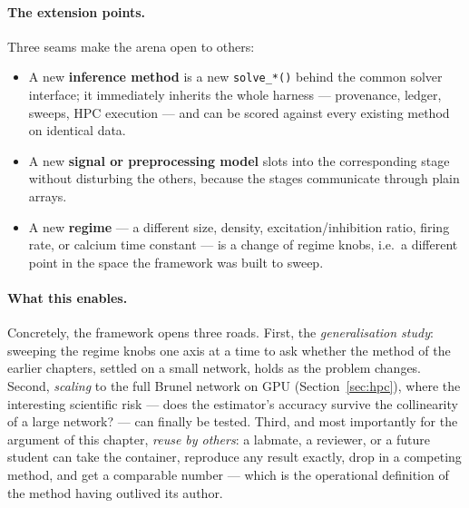 \documentclass[11pt,a4paper]{article}
\newcommand{\code}[1]{\texttt{#1}}
\begin{document}
\paragraph{The extension points.}
Three seams make the arena open to others:
\begin{itemize}[leftmargin=1.6em]
  \item A new \textbf{inference method} is a new \code{solve\_*()} behind the common solver
    interface; it immediately inherits the whole harness --- provenance, ledger, sweeps, HPC
    execution --- and can be scored against every existing method on identical data.
  \item A new \textbf{signal or preprocessing model} slots into the corresponding stage without
    disturbing the others, because the stages communicate through plain arrays.
  \item A new \textbf{regime} --- a different size, density, excitation/inhibition ratio, firing
    rate, or calcium time constant --- is a change of regime knobs, i.e.\ a different point in the
    space the framework was built to sweep.
\end{itemize}

\paragraph{What this enables.}
Concretely, the framework opens three roads. First, the \emph{generalisation study}: sweeping
the regime knobs one axis at a time to ask whether the method of the earlier chapters, settled on
a small network, holds as the problem changes. Second, \emph{scaling} to the full Brunel network
on GPU (Section~\ref{sec:hpc}), where the interesting scientific risk --- does the estimator's
accuracy survive the collinearity of a large network? --- can finally be tested. Third, and most
importantly for the argument of this chapter, \emph{reuse by others}: a labmate, a reviewer, or a
future student can take the container, reproduce any result exactly, drop in a competing method,
and get a comparable number --- which is the operational definition of the method having outlived
its author.
\end{document}
